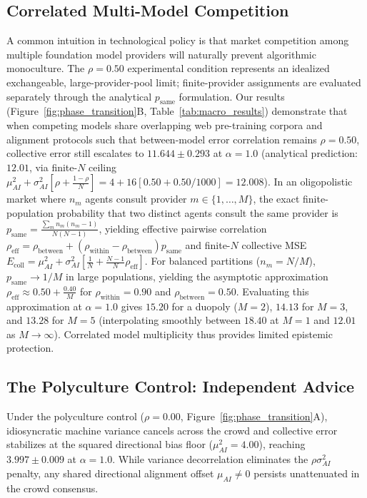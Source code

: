 \documentclass
[letterpaper]{article}
\begin{document}
\subsection{Correlated Multi-Model Competition}
A common intuition in technological policy is that market competition among multiple foundation model providers will naturally prevent algorithmic monoculture. The $\rho=0.50$ experimental condition represents an idealized exchangeable, large-provider-pool limit; finite-provider assignments are evaluated separately through the analytical $p_{\text{same}}$ formulation. Our results (Figure~\ref{fig:phase_transition}B, Table~\ref{tab:macro_results}) demonstrate that when competing models share overlapping web pre-training corpora and alignment protocols such that between-model error correlation remains $\rho = 0.50$, collective error still escalates to $11.644 \pm 0.293$ at $\alpha = 1.0$ (analytical prediction: $12.01$, via finite-$N$ ceiling $\mu_{AI}^2 + \sigma_{AI}^2[\rho + \frac{1-\rho}{N}] = 4 + 16[0.50 + 0.50/1000] = 12.008$). In an oligopolistic market where $n_m$ agents consult provider $m \in \{1,\dots,M\}$, the exact finite-population probability that two distinct agents consult the same provider is $p_{\text{same}} = \frac{\sum_m n_m(n_m - 1)}{N(N - 1)}$, yielding effective pairwise correlation $\rho_{\text{eff}} = \rho_{\text{between}} + (\rho_{\text{within}} - \rho_{\text{between}}) p_{\text{same}}$ and finite-$N$ collective MSE $E_{\text{coll}} = \mu_{AI}^2 + \sigma_{AI}^2 [\frac{1}{N} + \frac{N-1}{N}\rho_{\text{eff}}]$. For balanced partitions ($n_m = N/M$), $p_{\text{same}} \to 1/M$ in large populations, yielding the asymptotic approximation $\rho_{\text{eff}} \approx 0.50 + \frac{0.40}{M}$ for $\rho_{\text{within}} = 0.90$ and $\rho_{\text{between}} = 0.50$. Evaluating this approximation at $\alpha = 1.0$ gives $15.20$ for a duopoly ($M=2$), $14.13$ for $M=3$, and $13.28$ for $M=5$ (interpolating smoothly between $18.40$ at $M=1$ and $12.01$ as $M \to \infty$). Correlated model multiplicity thus provides limited epistemic protection.

\subsection{The Polyculture Control: Independent Advice}
Under the polyculture control ($\rho = 0.00$, Figure~\ref{fig:phase_transition}A), idiosyncratic machine variance cancels across the crowd and collective error stabilizes at the squared directional bias floor ($\mu_{AI}^2 = 4.00$), reaching $3.997 \pm 0.009$ at $\alpha = 1.0$. While variance decorrelation eliminates the $\rho\sigma_{AI}^2$ penalty, any shared directional alignment offset $\mu_{AI} \neq 0$ persists unattenuated in the crowd consensus.
\end{document}
